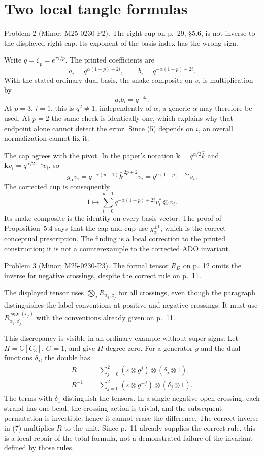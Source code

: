 \documentclass[10pt]{article}
\begin{document}
\section*{Two local tangle formulas}
Problem 2 (Minor; M25-0230-P2).  The right cup on p. 29, §5.6, is not inverse to the displayed right cap. Its exponent of the basis index has the wrong sign.\par
Write \(q=\zeta_p=e^{\pi i/p}\). The printed coefficients are \[a_i=q^{\alpha(1-p)-2i},\qquad
 b_i=q^{-\alpha(1-p)-2i}.\] With the stated ordinary dual basis, the snake composite on \(v_i\) is multiplication by \[a_i b_i=q^{-4i}.                \tag{5}\] At \(p=3\), \(i=1\), this is \(q^2\ne1\), independently of \(\alpha\); a generic \(\alpha\) may therefore be used. At \(p=2\) the same check is identically one, which explains why that endpoint alone cannot detect the error. Since (5) depends on \(i\), an overall normalization cannot fix it.\par
The cap agrees with the pivot. In the paper’s notation \(\mathbf k=q^{\alpha/2}\bar k\) and \(\mathbf k v_i=q^{\alpha/2-i}v_i\), so \[g_\alpha v_i
 =q^{-\alpha(p-1)}\bar k^{\,2p+2}v_i
 =q^{\alpha(1-p)-2i}v_i.\] The corrected cup is consequently \[1\longmapsto
              \sum_{i=0}^{p-1}q^{-\alpha(1-p)+2i}
                            v_i^*\otimes v_i.             \tag{6}\] Its snake composite is the identity on every basis vector. The proof of Proposition 5.4 says that the cap and cup use \(g_\alpha^{\pm1}\), which is the correct conceptual prescription. The finding is a local correction to the printed construction; it is not a counterexample to the corrected ADO invariant.\par
Problem 3 (Minor; M25-0230-P3).  The formal tensor \(R_D\) on p. 12 omits the inverse for negative crossings, despite the correct rule on p. 11.\par
The displayed tensor uses \(\bigotimes_j R_{\alpha_j,\beta_j}\) for all crossings, even though the paragraph distinguishes the label conventions at positive and negative crossings. It must use \(R_{\alpha_j,\beta_j}^{\operatorname{sign}(c_j)}\) with the conventions already given on p. 11.\par
This discrepancy is visible in an ordinary example without super signs. Let \(H=\mathbb C[C_3]\), \(G=1\), and give \(H\) degree zero. For a generator \(g\) and the dual functions \(\delta_j\), the double has \[\begin{split}
 R&=\sum_{j=0}^2(\varepsilon\otimes g^j)\otimes(\delta_j\otimes1),\\
 R^{-1}&=\sum_{j=0}^2(\varepsilon\otimes g^{-j})\otimes(\delta_j\otimes1).
 \end{split}                                             \tag{7}\] The terms with \(\delta_1\) distinguish the tensors. In a single negative open crossing, each strand has one bead, the crossing action is trivial, and the subsequent permutation is invertible; hence it cannot erase the difference. The correct inverse in (7) multiplies \(R\) to the unit. Since p. 11 already supplies the correct rule, this is a local repair of the total formula, not a demonstrated failure of the invariant defined by those rules.\par
\end{document}

